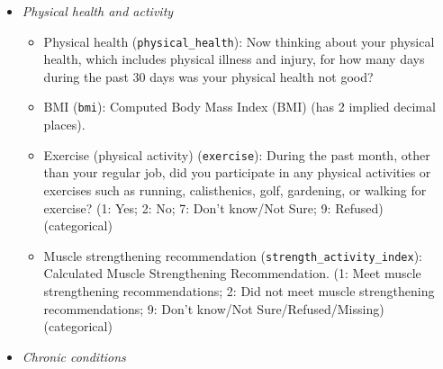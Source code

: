 \documentclass[
]{article}
\providecommand{\tightlist}{%
  \setlength{\itemsep}{0pt}\setlength{\parskip}{0pt}}
\begin{document}
\begin{itemize}
\tightlist
\item
  \emph{Physical health and activity}

  \begin{itemize}
  \tightlist
  \item
    Physical health (\texttt{physical\_health}): Now thinking about your physical health, which includes physical illness and injury, for how many days during the past 30 days was your physical health not good?
  \item
    BMI (\texttt{bmi}): Computed Body Mass Index (BMI) (has 2 implied decimal places).
  \item
    Exercise (physical activity) (\texttt{exercise}): During the past month, other than your regular job, did you participate in any physical activities or exercises such as running, calisthenics, golf, gardening, or walking for exercise? (1: Yes; 2: No; 7: Don't know/Not Sure; 9: Refused) (categorical)
  \item
    Muscle strengthening recommendation (\texttt{strength\_activity\_index}): Calculated Muscle Strengthening Recommendation. (1: Meet muscle strengthening recommendations; 2: Did not meet muscle strengthening recommendations; 9: Don't know/Not Sure/Refused/Missing) (categorical)
  \end{itemize}
\item
  \emph{Chronic conditions}


\end{itemize}
\end{document}

